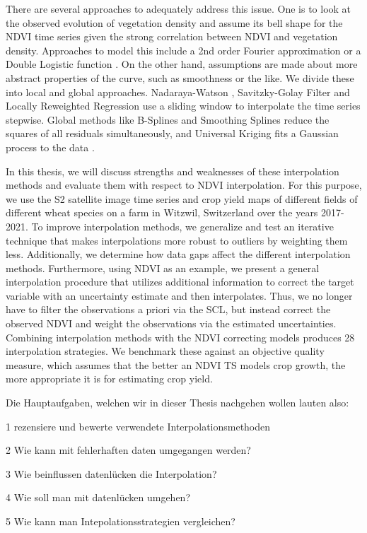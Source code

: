 There are several approaches to adequately address this issue. One is to look at the observed evolution of vegetation density and assume its bell shape for the NDVI time series given the strong correlation between NDVI and vegetation density. Approaches to model this include a 2nd order Fourier approximation \citep{stockliEuropeanPlantPhenology2004} or a Double Logistic function \citep{beckImprovedMonitoringVegetation2006}.
On the other hand, assumptions are made about more abstract properties of the curve, such as smoothness or the like. We divide these into local and global approaches. Nadaraya-Watson \citep{strbacEstimationEvapotrasnpirationUrban2017}, Savitzky-Golay Filter \citep{chenSimpleMethodReconstructing2004a} and Locally Reweighted Regression \citep{omoriAssessmentPaddyFields2021} use a sliding window to interpolate the time series stepwise. Global methods like B-Splines \citep{gurungPredictingEnhancedVegetation2009} and Smoothing Splines \citep{caiPerformanceSmoothingMethods2017} reduce the squares of all residuals simultaneously, and Universal Kriging fits a Gaussian process to the data \citep{chandolaScalableTimeSeries2010}.




In this thesis, we will discuss strengths and weaknesses of these interpolation methods and evaluate them with respect to NDVI interpolation. For this purpose, we use the S2 satellite image time series and crop yield maps of different fields of different wheat species on a farm in Witzwil, Switzerland over the years 2017-2021.
To improve interpolation methods, we generalize and test an iterative technique that makes interpolations more robust to outliers by weighting them less. Additionally, we determine how data gaps affect the different interpolation methods. Furthermore, using NDVI as an example, we present a general interpolation procedure that utilizes additional information to correct the target variable with an uncertainty estimate and then interpolates. Thus, we no longer have to filter the observations a priori via the SCL, but instead correct the observed NDVI and weight the observations via the estimated uncertainties. Combining interpolation methods with the NDVI correcting models produces 28 interpolation strategies. We benchmark these against an objective quality measure, which assumes that the better an NDVI TS models crop growth, the more appropriate it is for estimating crop yield.

Die Hauptaufgaben, welchen wir in dieser Thesis nachgehen wollen lauten also:
\begin{Nenumerate}
    \item 1 rezensiere und bewerte verwendete Interpolationsmethoden
    \item 2 Wie kann mit fehlerhaften daten umgegangen werden?
    \item 3 Wie beinflussen datenlücken die Interpolation?
    \item 4 Wie soll man mit datenlücken umgehen?
    \item 5 Wie kann man Intepolationsstrategien vergleichen?
\end{Nenumerate}


